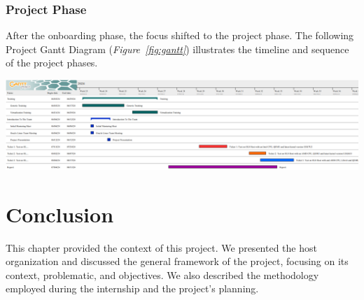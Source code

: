 \subsubsection[Project Phase]{Project Phase}
After the onboarding phase, the focus shifted to the project phase. The following Project Gantt Diagram (\textit{Figure~\ref{fig:gantt}}) illustrates the timeline and sequence of the project phases.

\begin{center}
    \centering
    \includegraphics[width=\textwidth]{Images/Gantt Diagram.png}
    \label{fig:gantt}
\end{center}

\section{Conclusion}
This chapter provided the context of this project. We presented the host organization and discussed the general framework of the project, focusing on its context, problematic, and objectives. We also described  the methodology employed during the internship and the project's planning.